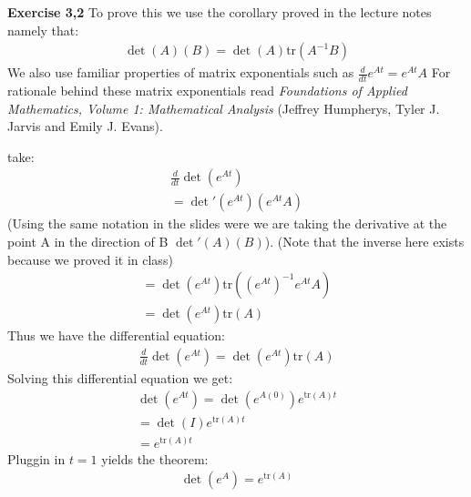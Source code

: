 \documentclass[12pt]{article}
\newenvironment{exercise}[1]{\vspace{.1in}\noindent\textbf{Exercise #1 \hspace{.05em}}}{}
\newcommand{\tr}{\text{tr}}
\theoremstyle{definition}
\theoremstyle{remark}
\begin{document}
\begin{exercise}{3,2}
	To prove this we use the corollary proved in the lecture notes namely that:
	\begin{align}
		\det(A)(B)=\det(A)\tr(A^{-1}B)
	\end{align}
	We also use familiar properties of matrix exponentials such as $\frac{d}{dt}e^{At}=e^{At}A$ For rationale behind these matrix exponentials read \textit{Foundations of Applied Mathematics, Volume 1: Mathematical Analysis} (Jeffrey Humpherys, Tyler J. Jarvis and Emily J. Evans).

	take:
	\begin{align}
		\frac{d}{dt}\det(e^{At}) \\
		=\det'(e^{At})(e^{At}A)
	\end{align}
	(Using the same notation in the slides were we are taking the derivative at the point A in the direction of B $\det'(A)(B)$). (Note that the inverse here exists because we proved it in class)
	\begin{align}
		=\det(e^{At})\tr((e^{At})^{-1}e^{At}A) \\
		=\det(e^{At})\tr(A)
	\end{align}
	Thus we have the differential equation:
	\begin{align}
		\frac{d}{dt}\det(e^{At})=\det(e^{At})\tr(A)
	\end{align}
	Solving this differential equation we get:
	\begin{align}
		\det(e^{At})=\det(e^{A(0)})e^{\tr(A)t} \\
		=\det(I)e^{\tr(A)t}                    \\
		=e^{\tr(A)t}
	\end{align}
	Pluggin in $t=1$ yields the theorem:
	\begin{align}
		\det(e^{A})=e^{\tr(A)}
	\end{align}
\end{exercise}
\end{document}
